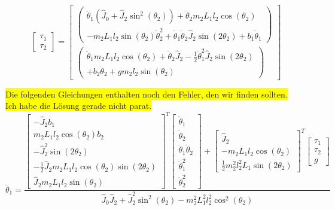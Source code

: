 \begin{equation}
\begin{bmatrix}
\tau_1 \\
\tau_2
\end{bmatrix}
=
\begin{bmatrix}
\begin{pmatrix}
\ddot{\theta}_1(\hat{J}_0+\hat{J}_2\sin^2(\theta_2))+\ddot{\theta}_2m_2L_1l_2\cos(\theta_2)			\\
-m_2L_1l_2\sin(\theta_2)\dot{\theta}^2_2+\dot{\theta}_1\dot{\theta}_2\hat{J}_2\sin(2\theta_2)+b_1\dot{\theta}_1
\end{pmatrix}
\\
\begin{pmatrix}
\ddot{\theta}_1m_2L_1l_2\cos(\theta_2)+\ddot{\theta}_2\hat{J}_2-\frac{1}{2}\dot{\theta}^2_1\hat{J}_2\sin(2\theta_2)						\\
+b_2\dot{\theta}_2+gm_2l_2\sin(\theta_2)
\end{pmatrix}
\end{bmatrix}
\end{equation}


\colorbox{yellow}{Die folgenden Gleichungen enthalten noch den Fehler, den wir finden sollten.} \\
\colorbox{yellow}{Ich habe die Lösung gerade nicht parat.}
\begin{equation}
\ddot{\theta}_1 =
\frac{
\begin{bmatrix}
-\hat{J}_2b_1 \\ 
m_2L_1l_2\cos(\theta_2)b_2 \\ 
-\hat{J}^2_2\sin(2\theta_2) \\ 
-\frac{1}{2}\hat{J}_2m_2L_1l_2\cos(\theta_2)\sin(2\theta_2) \\ 
\hat{J}_2m_2L_1l_2\sin(\theta_2)
\end{bmatrix}^T
\begin{bmatrix}
\dot{\theta}_1 \\ 
\dot{\theta}_2 \\ 
\dot{\theta}_1\dot{\theta}_2 \\ 
\dot{\theta}^2_1 \\ 
\dot{\theta}^2_2
\end{bmatrix}
+
\begin{bmatrix}
\hat{J}_2 \\ 
-m_2L_1l_2\cos(\theta_2) \\ 
\frac{1}{2}m^2_2l^2_2L_1\sin(2\theta_2)
\end{bmatrix}^T
\begin{bmatrix}
\tau_1 \\ 
\tau_2 \\ 
g
\end{bmatrix} }
{\hat{J}_0\hat{J}_2+\hat{J}^2_2\sin^2(\theta_2)-m^2_2L^2_1l^2_2\cos^2(\theta_2)}
\end{equation}



